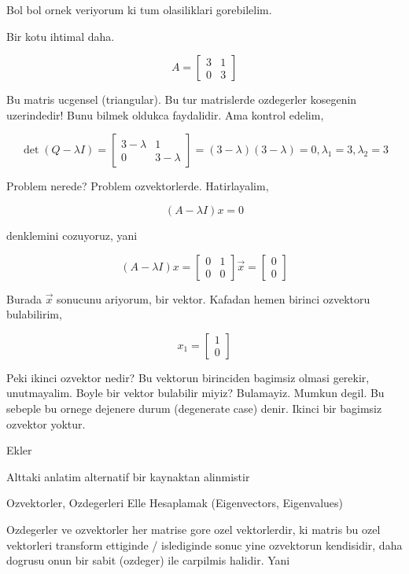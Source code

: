 \documentclass[12pt,fleqn]{article}\usepackage{../common}
\begin{document}
Bol bol ornek veriyorum ki tum olasiliklari gorebilelim. 

Bir kotu ihtimal daha.

$$ A = 
\left[\begin{array}{ccc}
3 & 1 \\ 0 & 3
\end{array}\right]
 $$

Bu matris ucgensel (triangular). Bu tur matrislerde ozdegerler kosegenin
uzerindedir! Bunu bilmek oldukca faydalidir. Ama kontrol edelim,

$$ \det(Q - \lambda I) = 
\left[\begin{array}{ccc}
3-\lambda & 1 \\
0 & 3-\lambda
\end{array}\right] = (3-\lambda)(3-\lambda) = 0, 
\lambda_1 = 3, \lambda_2 = 3
 $$

Problem nerede? Problem ozvektorlerde. Hatirlayalim, 

$$ (A-\lambda I)x = 0$$

denklemini cozuyoruz, yani

$$ (A-\lambda I)x = 
\left[\begin{array}{cc}
0 & 1 \\ 
0 & 0
\end{array}\right]
\vec{x}
=
\left[\begin{array}{c}
0 \\ 0
\end{array}\right]
$$

Burada $\vec{x}$ sonucunu ariyorum, bir vektor. Kafadan hemen birinci
ozvektoru bulabilirim, 

$$ x_1 = \left[\begin{array}{c}
1 \\ 0
\end{array}\right] $$

Peki ikinci ozvektor nedir? Bu vektorun birinciden bagimsiz olmasi gerekir,
unutmayalim. Boyle bir vektor bulabilir miyiz? Bulamayiz. Mumkun degil. Bu
sebeple bu ornege dejenere durum (degenerate case) denir. Ikinci bir
bagimsiz ozvektor yoktur. 

Ekler 

Alttaki anlatim alternatif bir kaynaktan alinmistir

Ozvektorler, Ozdegerleri Elle Hesaplamak (Eigenvectors, Eigenvalues)

Ozdegerler ve ozvektorler her matrise gore ozel vektorlerdir, ki matris bu
ozel vektorleri transform ettiginde / islediginde sonuc yine ozvektorun
kendisidir, daha dogrusu onun bir sabit (ozdeger) ile carpilmis
halidir. Yani
\end{document}

